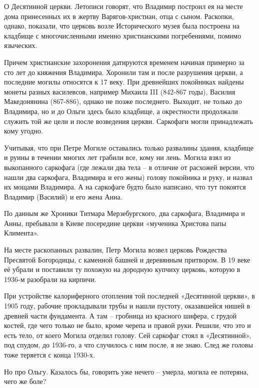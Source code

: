 О Десятинной церкви. Летописи говорят, что Владимир построил ея на месте дома принесенных их в жертву Варягов-христиан, отца с сыном. Раскопки, однако, показали, что церковь возле Исторического музея была построена на кладбище с многочисленными именно христианскими погребениями, помимо языческих.

Причем христианские захоронения датируются временем начиная примерно за сто лет до княжения Владимира. Хоронили там и после разрушения церкви, а последние могилы относятся к 17 веку. При древнейших покойниках найдены монеты  разных василевсов, например Михаила III (842-867 годы), Василия Македонянина (867-886), однако не позже последнего. Выходит, не только до Владимира, но и до Ольги здесь было кладбище, а окрестности продолжали служить той же цели и после возведения церкви. Саркофаги могли принадлежать кому угодно. 

Учитывая, что при Петре Могиле оставались только развалины здания, кладбище и руины в течении многих лет грабили все, кому ни лень. Могила взял из выкопанного саркофага (где лежали два тела – в отличие от расхожей версии, что нашли два саркофага, Владимира и его жены) голову покойника и руку, и назвал их мощами Владимира. А на саркофаге будто было написано, что тут покоятся Владимир (Василий) и его жена Анна.

По данным же Хроники Титмара Мерзебургского, два саркофага, Владимира и Анны, пребывали в Киеве посередине церкви «мученика Христова папы Климента».


На месте раскопанных развалин, Петр Могила возвел церковь Рождества Пресвятой Богородицы, с каменной башней и деревянным притвором. В 19 веке её убрали и поставили ту похожую на дородную купчиху церковь, которую в 1936-м разобрали на кирпичи. 

При устройстве калориферного отопления той последней «Десятинной церкви», в 1905 году, рабочие прокладывали трубы и нашли пустоту, оказавшейся нишей в древней части фундамента. А там – гробница из красного шифера, с грудой костей, где чего только не было, кроме черепа и правой руки. Решили, что это и есть тело, от коего Могила отделил голову. Сей саркофаг стоял в «Десятинной», под спудом, до 1936-го, а что случилось с ним после, я не знаю. След же головы тоже теряется с конца 1930-х.

Но про Ольгу. Казалось бы, говорить уже нечего – умерла, могила ее потеряна, чего же боле?
